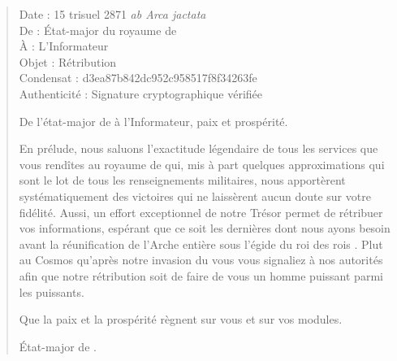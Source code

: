 \begin{quotation}
  \ttfamily\RaggedRight
  \noindent{}Date : 15 trisuel 2871 \emph{ab Arca jactata}\\
  De : État-major du royaume de \campoppose{}\\
  À : L’Informateur\\
  Objet : Rétribution\\
  Condensat : d3ea87b842dc952c958517f8f34263fe\\
  Authenticité : Signature cryptographique vérifiée
  \nopagebreak\vspace{1em}

  De l’état-major de \campoppose{} à l’Informateur, paix et prospérité.
  \nopagebreak\vspace{1em}

  En prélude, nous saluons l’exactitude légendaire de tous les services que vous rendîtes au royaume de \campoppose{} qui, mis à part quelques approximations qui sont le lot de tous les renseignements militaires, nous apportèrent systématiquement des victoires qui ne laissèrent aucun doute sur votre fidélité. Aussi, un effort exceptionnel de notre Trésor permet de rétribuer vos informations, espérant que ce soit les dernières dont nous ayons besoin avant la réunification de l’Arche entière sous l’égide du roi des rois \darius.
  Plut au Cosmos qu’après notre invasion du \campprincipal{} vous vous signaliez à nos autorités afin que notre rétribution soit de faire de vous un homme puissant parmi les puissants.

  \nopagebreak\vspace{1em}
  Que la paix et la prospérité règnent sur vous et sur vos modules.

  \nopagebreak\vspace{1em}
  \hfill État-major de \campoppose{}.
\end{quotation}

\scene

\StageDirII{\ela, \roi}


